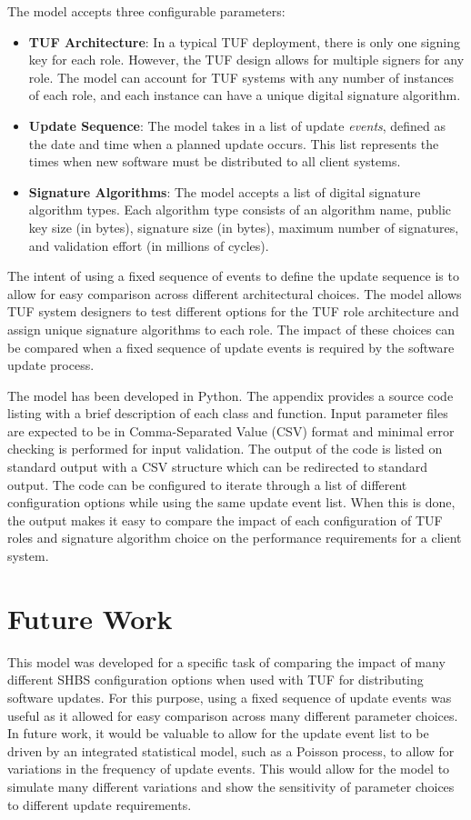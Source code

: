 \documentclass{article}
\begin{document}
The model accepts three configurable parameters:
\begin{itemize}
  \item \textbf{TUF Architecture}:  In a typical TUF deployment, there is only one signing key for each role.  However, the TUF design allows for multiple signers for any role.  The model can account for TUF systems with any number of instances of each role, and each instance can have a unique digital signature algorithm.
  \item \textbf{Update Sequence}: The model takes in a list of update \emph{events}, defined as the date and time when a planned update occurs.  This list represents the times when new software must be distributed to all client systems.
  \item \textbf{Signature Algorithms}: The model accepts a list of digital signature algorithm types.  Each algorithm type consists of an algorithm name, public key size (in bytes), signature size (in bytes), maximum number of signatures, and validation effort (in millions of cycles).  
\end{itemize}

The intent of using a fixed sequence of events to define the update sequence is to allow for easy comparison across different architectural choices.  The model allows TUF system designers to test different options for the TUF role architecture and assign unique signature algorithms to each role.  The impact of these choices can be compared when a fixed sequence of update events is required by the software update process.  

The model has been developed in Python.  The appendix provides a source code listing with a brief description of each class and function.  Input parameter files are expected to be in Comma-Separated Value (CSV) format and minimal error checking is performed for input validation.  The output of the code is listed on standard output with a CSV structure which can be redirected to standard output.  The code can be configured to iterate through a list of different configuration options while using the same update event list.  When this is done, the output makes it easy to compare the impact of each configuration of TUF roles and signature algorithm choice on the performance requirements for a client system.

\section{Future Work}
This model was developed for a specific task of comparing the impact of many different SHBS configuration options when used with TUF for distributing software updates.  For this purpose, using a fixed sequence of update events was useful as it allowed for easy comparison across many different parameter choices.  In future work, it would be valuable to allow for the update event list to be driven by an integrated statistical model, such as a Poisson process, to allow for variations in the frequency of update events.  This would allow for the model to simulate many different variations and show the sensitivity of parameter choices to different update requirements.  
\end{document}
